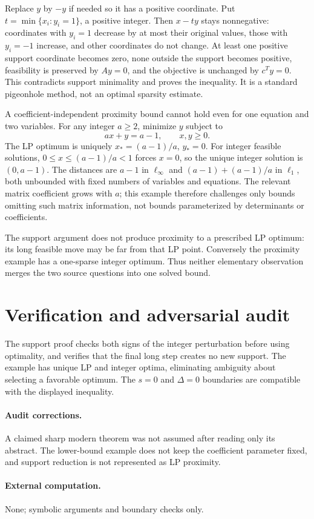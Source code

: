 \documentclass[11pt]{article}
\begin{document}
Replace $y$ by $-y$ if needed so it has a positive coordinate. Put $t=\min\{x_i:y_i=1\}$, a positive integer. Then $x-ty$ stays nonnegative: coordinates with $y_i=1$ decrease by at most their original values, those with $y_i=-1$ increase, and other coordinates do not change. At least one positive support coordinate becomes zero, none outside the support becomes positive, feasibility is preserved by $Ay=0$, and the objective is unchanged by $c^Ty=0$. This contradicts support minimality and proves the inequality. It is a standard pigeonhole method, not an optimal sparsity estimate.

A coefficient-independent proximity bound cannot hold even for one equation and two variables. For any integer $a\ge2$, minimize $y$ subject to
\[
ax+y=a-1,\qquad x,y\ge0.
\]
The LP optimum is uniquely $x_*=(a-1)/a$, $y_*=0$. For integer feasible solutions, $0\le x\le(a-1)/a<1$ forces $x=0$, so the unique integer solution is $(0,a-1)$. The distances are $a-1$ in $\ell_\infty$ and $(a-1)+(a-1)/a$ in $\ell_1$, both unbounded with fixed numbers of variables and equations. The relevant matrix coefficient grows with $a$; this example therefore challenges only bounds omitting such matrix information, not bounds parameterized by determinants or coefficients.

The support argument does not produce proximity to a prescribed LP optimum: its long feasible move may be far from that LP point. Conversely the proximity example has a one-sparse integer optimum. Thus neither elementary observation merges the two source questions into one solved bound.
\section{Verification and adversarial audit}
The support proof checks both signs of the integer perturbation before using optimality, and verifies that the final long step creates no new support. The example has unique LP and integer optima, eliminating ambiguity about selecting a favorable optimum. The $s=0$ and $\Delta=0$ boundaries are compatible with the displayed inequality.
\paragraph{Audit corrections.} A claimed sharp modern theorem was not assumed after reading only its abstract. The lower-bound example does not keep the coefficient parameter fixed, and support reduction is not represented as LP proximity.
\paragraph{External computation.} None; symbolic arguments and boundary checks only.
\end{document}
